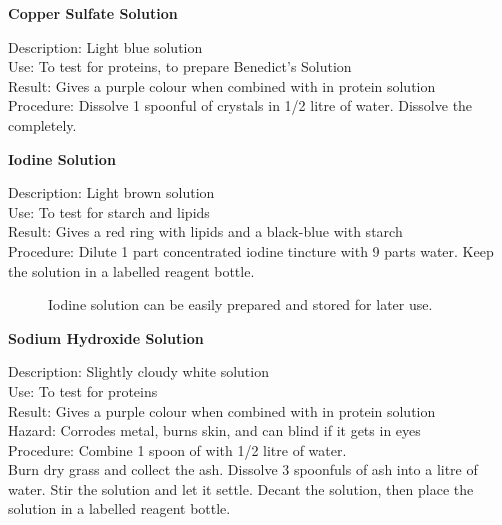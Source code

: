 \begin{flushleft}
\textbf{Copper Sulfate Solution}
\end{flushleft}
\vspace{-10pt}
Description: Light blue solution\\
Use: To test for proteins, to prepare Benedict's Solution\\
Result: Gives a purple colour when combined with  in protein solution\\
Procedure: Dissolve 1 spoonful of  crystals in 1/2 litre of water. Dissolve the  completely.\\

\begin{flushleft}
\textbf{Iodine Solution}
\end{flushleft}
\vspace{-10pt}
Description: Light brown solution\\
Use: To test for starch and lipids\\
Result: Gives a red ring with lipids and a black-blue with starch\\
Procedure: Dilute 1 part concentrated iodine tincture with 9 parts water. Keep the solution in a labelled reagent bottle.\\

\begin{figure}[h]
\begin{center}
\def\svgwidth{2cm}

\caption{Iodine solution can be easily prepared and stored for later use.}
\label{fig:iodine}
\end{center}
\end{figure}

\begin{flushleft}
\textbf{Sodium Hydroxide Solution}
\end{flushleft}
\vspace{-10pt}
Description: Slightly cloudy white solution\\
Use: To test for proteins\\
Result: Gives a purple colour when combined with  in protein solution\\
Hazard: Corrodes metal, burns skin, and can blind if it gets in eyes\\
Procedure: Combine 1 spoon of  with 1/2 litre of water.\\
Burn dry grass and collect the ash. Dissolve 3 spoonfuls of ash into a litre of water. Stir the solution and let it settle. Decant the solution, then place the solution in a labelled reagent bottle.